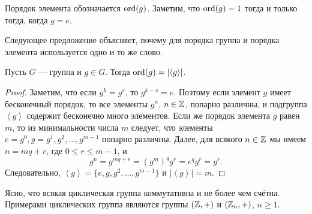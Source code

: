 Порядок элемента обозначается $\operatorname{\mathop{\mathrm{ord}}}(g)$. Заметим, что $\operatorname{\mathop{\mathrm{ord}}}(g) = 1$ тогда и только тогда, когда $g = e$.

Следующее предложение объясняет, почему для порядка группа и порядка элемента используется одно и то же слово.

\begin{proposal}
    Пусть $G$ --- группа и $g \in G$. Тогда $\operatorname{\mathop{\mathrm{ord}}}(g) = \left|\left< g \right>\right|$.
\end{proposal}

\begin{proof}
    Заметим, что если $g^{k} = g^{s}$, то $g^{k - s} = e$. Поэтому если элемент $g$ имеет бесконечный порядок, то все элементы $g^{n}$, $n \in \mathbb{Z}$, попарно различны, и подгруппа $\left< g \right>$ содержит бесконечно много элементов. Если же порядок элемента $g$ равен $m$, то из минимальности числа $m$ следует, что элементы $e = g^0, g = g^{1}, g^{2}, \dots, g^{m - 1}$ попарно различны. Далее, для всякого $n \in \mathbb{Z}$ мы имеем $n = mq + r$, где $0 \leq r \leq m - 1$, и 
    \begin{equation*}
        g^{n} = g^{mq + r} = \left(g^{m}\right)^{q} g^{r} = e^{q} g^{r} = g^{r}
    .\end{equation*}
    Следовательно, $\left< g \right> = \{e, g, g^2, \dots, g^{m - 1}\}$ и $\left|\left< g \right>\right| = m$.
\end{proof}

Ясно, что всякая циклическая группа коммутативна и не более чем счётна. Примерами циклических группа являются группы $(\mathbb{Z}, +)$ и $(\mathbb{Z}_n, +)$, $n \geq 1$.
